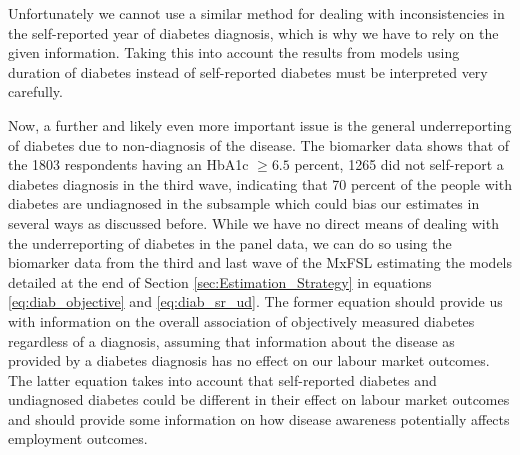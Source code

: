 Unfortunately we cannot use a similar method for dealing with inconsistencies
in the self-reported year of diabetes diagnosis, which is why we have
to rely on the given information. Taking this into account the results
from models using duration of diabetes instead of self-reported diabetes
must be interpreted very carefully.

Now, a further and likely even more important issue is the general underreporting of diabetes due to non-diagnosis of the disease. The biomarker data shows that of the 1803 respondents having an \ac{HbA1c} $\geq6.5$ percent, 1265 did
not self-report a diabetes diagnosis in the third wave, indicating
that 70 percent of the people with diabetes are undiagnosed in the
subsample which could bias our estimates in several ways as discussed before.
While we have no direct means of dealing with the underreporting of diabetes in the panel data, we can do so using the biomarker data from the third and last wave of the \ac{MxFSL} estimating the models detailed at the end of Section \ref{sec:Estimation_Strategy} in equations \ref{eq:diab_objective} and \ref{eq:diab_sr_ud}. The former equation should provide us with information on the overall association of objectively measured diabetes regardless of a diagnosis, assuming that information about the disease as provided by a diabetes diagnosis has no effect on our labour market outcomes. The latter equation takes into account that self-reported diabetes and undiagnosed diabetes could be different in their effect on labour market outcomes and should provide some information on how disease awareness potentially affects employment outcomes.

  
  
  
  
  
  